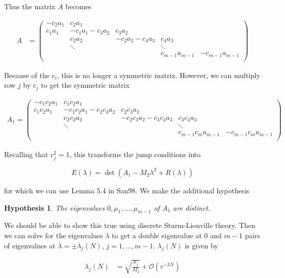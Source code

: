 \documentclass[12pt]{article}
\newtheorem{hypothesis}{Hypothesis}
\begin{document}
Thus the matrix $A$ becomes

\begin{align*}
A &= \begin{pmatrix}
-c_2 a_1 & c_2 a_1 & & &  \\
c_1 a_1 & -c_1 a_1 - c_3 a_2 & c_3 a_2 \\
& c_2 a_2 & -c_2 a_2 - c_4 a_3 & c_4 a_3 \\
& \ddots & & \ddots \\
& & & c_{m-1} a_{m-1} & -c_{m-1} a_{m-1}  \\
\end{pmatrix}
\end{align*}

Because of the $c_i$, this is no longer a symmetric matrix. However, we can multiply row $j$ by $c_j$ to get the symmetric matrix

\begin{align*}
A_1 = 
\begin{pmatrix}
-c_1 c_2 a_1 & c_1 c_2 a_1 & & &  \\
c_1 c_2 a_1 & -c_1 c_2 a_1 - c_2 c_3 a_2 & c_2 c_3 a_2 \\
& c_2 c_3 a_2 & -c_2 c_3 a_2 - c_3 c_4 a_3  & c_3 c_4 a_3 \\
& \ddots & & \ddots \\
& & & c_{m-1} c_m a_{m-1} & -c_{m-1} c_m a_{m-1} \\
\end{pmatrix}
\end{align*}

Recalling that $c_j^2 = 1$, this transforms the jump conditions into

\[
E(\lambda) = 
\det(A_1 - M_2 \lambda^2 + R(\lambda) )
\]

for which we can use Lemma 5.4 in San98. We make the additional hypothesis

\begin{hypothesis}\label{A0distincteigs}
The eigenvalues $0, \mu_1, \dots, \mu_{m-1}$ of $A_1$ are distinct.
\end{hypothesis}

We should be able to show this true using discrete Sturm-Liouville theory. Then we can solve for the eigenvalues $\lambda$ to get a double eigenvalue at 0 and $m-1$ pairs of eigenvalues at $\lambda = \pm \lambda_j(N)$, $j = 1, \dots, m-1$. $\lambda_j(N)$ is given by

\begin{align*}
\lambda_j(N) &= \sqrt{\frac{\mu_j}{M_2}} + \mathcal{O}(r^{-3N}) 
\end{align*}
\end{document}
